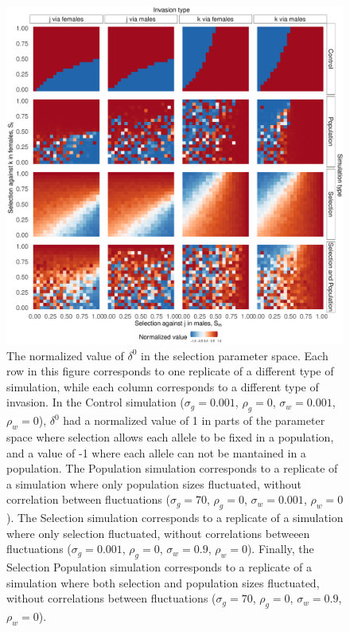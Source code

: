 \documentclass[12pt]{article}
\begin{document}
\begin{figure}[H]
  \centerline{\includegraphics[width=1\textwidth]{ratios.pdf}}
  \caption{ The normalized value of  $\delta^{0}$ in the selection parameter space. Each row in this figure corresponds to one replicate of a different type of simulation, while each column corresponds to a different type of invasion. In the Control simulation ($\sigma_{g}=0.001$, $\rho_{g}=0$, $\sigma_{w}=0.001$, $\rho_{w}=0$), $\delta^{0}$ had a normalized value of 1 in parts of the parameter space where selection allows each allele to be fixed in a population, and a value of -1 where each allele can not be mantained in a population. The Population simulation corresponds to a replicate of a simulation where only population sizes fluctuated, without correlation between fluctuations ($\sigma_{g}=70$, $\rho_{g}=0$, $\sigma_{w}=0.001$, $\rho_{w}=0$). The Selection simulation corresponds to a replicate of a simulation where only selection fluctuated, without correlations betweeen fluctuations ($\sigma_{g}=0.001$, $\rho_{g}=0$, $\sigma_{w}=0.9$, $\rho_{w}=0$). Finally, the Selection Population simulation corresponds to a replicate of a simulation where both selection and population sizes fluctuated, without correlations between fluctuations ($\sigma_{g}=70$, $\rho_{g}=0$, $\sigma_{w}=0.9$, $\rho_{w}=0$).  }
    \label{fig:ratios}
\end{figure}
\end{document}
